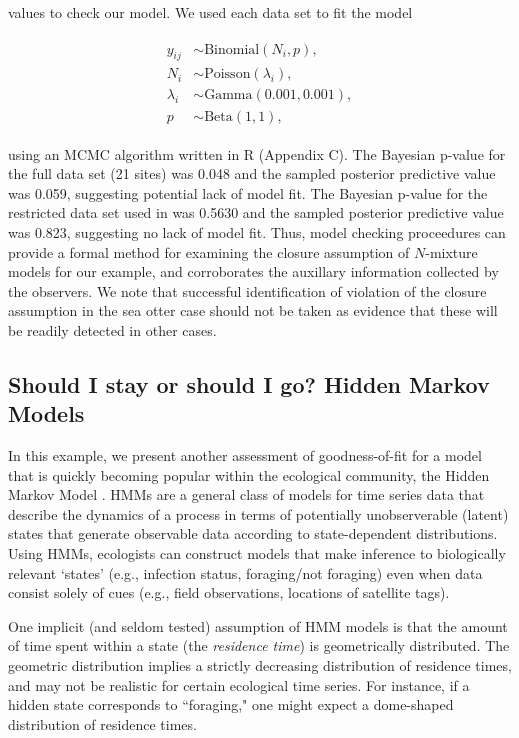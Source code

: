 \documentclass[12pt,english]{article}
\begin{document}
\begin{spacing}{1.9}
values to check our model. We used each data set to fit the model
\begin{linenomath}
  \begin{align}
    \begin{split}
      y_{ij} & \sim \text{Binomial}(N_{i},p),\\
      N_{i} & \sim \text{Poisson}(\lambda_{i}), \\
      \lambda_i & \sim
      \text{Gamma}(0.001,0.001), \\
      p & \sim \text{Beta}(1,1),
    \end{split} \nonumber
          \label{eq:nmix2}
  \end{align}
\end{linenomath}
using an MCMC algorithm written in R (Appendix C). The Bayesian
p-value for the full data set (21 sites) was 0.048 and the sampled
posterior predictive value was 0.059, suggesting potential lack of
model fit. The Bayesian p-value for the restricted data set used in
\citet{williams2017estimating} was 0.5630 and the sampled posterior
predictive value was 0.823, suggesting no lack of model fit. Thus,
model checking proceedures can provide a formal method for examining
the closure assumption of $N$-mixture models for our example, and
corroborates the auxillary information collected by the observers. We
note that successful identification of violation of the closure
assumption in the sea otter case should not be taken as evidence that
these will be readily detected in other cases.

\subsection{Should I stay or should I go? Hidden Markov Models}

In this example, we present another assessment of goodness-of-fit for
a model that is quickly becoming popular within the ecological
community, the Hidden Markov Model
\citep[HMM;][]{zucchini2009hidden}. HMMs are a general class of models
for time series data that describe the dynamics of a process in terms
of potentially unobserverable (latent) states that generate observable
data according to state-dependent distributions. Using HMMs,
ecologists can construct models that make inference to biologically
relevant `states' (e.g., infection status, foraging/not foraging) even
when data consist solely of cues (e.g., field observations, locations
of satellite tags).

One implicit (and seldom tested) assumption of HMM models is that the
amount of time spent within a state (the {\it residence time}) is
geometrically distributed. The geometric distribution implies a
strictly decreasing distribution of residence times, and may not be
realistic for certain ecological time series.  For instance, if a
hidden state corresponds to ``foraging," one might expect a
dome-shaped distribution of residence times.


\end{spacing}
\end{document}
